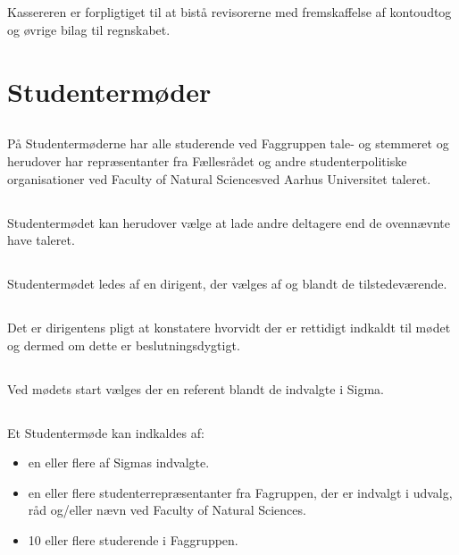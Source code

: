 \documentclass[danish,a4paper,twocolumn]{article}
\newcommand{\foreningen}{Sigma}
\newcommand{\fakultetet}{Faculty of Natural Sciences}
\begin{document}
\subsection{}Kassereren er forpligtiget til at bistå revisorerne med fremskaffelse af kontoudtog og øvrige bilag til regnskabet.

\section{Studentermøder}\label{par:studmdr}
\subsection{}På Studentermøderne har alle studerende ved Faggruppen tale- og stemmeret og herudover har repræsentanter fra Fællesrådet og andre studenterpolitiske organisationer ved \fakultetet ved Aarhus Universitet taleret.

\subsection{}Studentermødet kan herudover vælge at lade andre deltagere end de ovennævnte have taleret.
\subsection{}Studentermødet ledes af en dirigent, der vælges af og blandt de tilstedeværende.
\subsection{}Det er dirigentens pligt at konstatere hvorvidt der er rettidigt indkaldt til mødet og dermed om dette er beslutningsdygtigt.
\subsection{} Ved mødets start vælges der en referent blandt de indvalgte i \foreningen.
\subsection{}Et Studentermøde kan indkaldes af:
\begin{itemize}
        \item en eller flere af \foreningen s indvalgte.
        \item en eller flere studenterrepræsentanter fra Fagruppen, der er
            indvalgt i udvalg, råd og/eller nævn ved \fakultetet.
        \item 10 eller flere studerende i Faggruppen.
\end{itemize}
\end{document}
